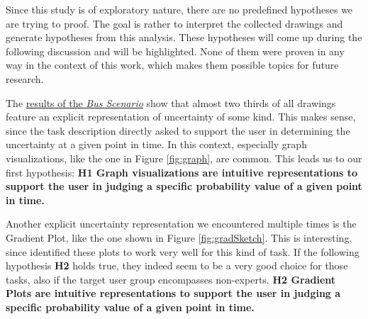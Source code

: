 Since this study is of exploratory nature, there are no predefined hypotheses we are trying to proof. The goal is rather to interpret the collected drawings and generate hypotheses from this analysis. These hypotheses will come up during the following discussion and will be highlighted. None of them were proven in any way in the context of this work, which makes them possible topics for future research. \par \medskip

The \hyperref[tb:t1]{results of the \textit{Bus Scenario}} show that almost two thirds of all drawings feature an explicit representation of uncertainty of some kind. This makes sense, since the task description directly asked to support the user in determining the uncertainty at a given point in time. In this context, especially graph visualizations, like the one in Figure \ref{fig:graph}, are common. This leads us to our first hypothesis: \textbf{H1 Graph visualizations are intuitive representations to support the user in judging a specific probability value of a given point in time.} \par \medskip

Another explicit uncertainty representation we encountered multiple times is the Gradient Plot, like the one shown in Figure \ref{fig:gradSketch}. This is interesting, since \citet{gschwandtner2016visual} identified these plots to work very well for this kind of task. If the following hypothesis \textbf{H2} holds true, they indeed seem to be a very good choice for those tasks, also if the target user group encompasses non-experts. \textbf{H2 Gradient Plots are intuitive representations to support the user in judging a specific probability value of a given point in time.}\par \medskip

